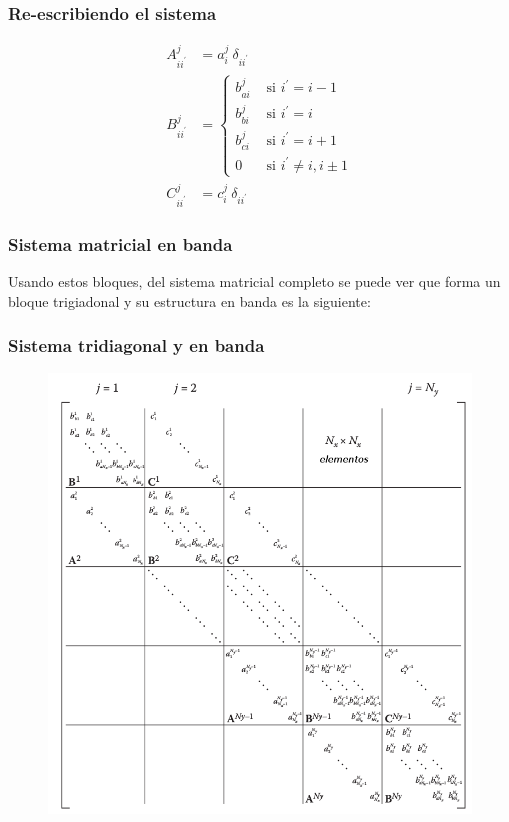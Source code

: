 \documentclass[12pt]{beamer}
\begin{document}
\begin{frame}
\frametitle{Re-escribiendo el sistema}
\begin{equation}
\begin{aligned}
A_{ii^{\prime}}^{j} &= a_{i}^{j} \: \delta_{ii^{\prime}} \\
B_{ii^{\prime}}^{j} &= \begin{cases}
b_{ai}^{j} & \mbox{ si } i^{\prime} = i-1 \\
b_{bi}^{j} & \mbox{ si } i^{\prime} = i \\
b_{ci}^{j} & \mbox{ si } i^{\prime} = i+1 \\
0 & \mbox{ si } i^{\prime} \neq i, i \pm 1 \end{cases} \\
C_{ii^{\prime}}^{j} &= c_{i}^{j} \: \delta_{ii^{\prime}}
\end{aligned}
\label{eq:ecuacion:13_16}
\end{equation}
\end{frame}
\begin{frame}
\frametitle{Sistema matricial en banda}
Usando estos bloques, del sistema matricial completo se puede ver que forma un bloque trigiadonal y su estructura en banda es la siguiente:
\end{frame}
{
\begin{frame}
\frametitle{Sistema tridiagonal y en banda}
\begin{figure}
	\centering
	\includegraphics[scale=0.27]{Imagenes/Sistema_Matricial_Completo.png}
\end{figure}    
\end{frame}
}
\end{document}
